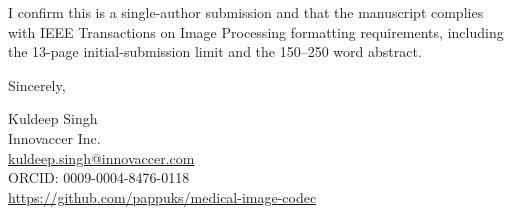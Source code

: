 \documentclass[12pt]{article}
\begin{document}
\bigskip

I confirm this is a single-author submission and that the manuscript complies
with IEEE Transactions on Image Processing formatting requirements, including
the 13-page initial-submission limit and the 150--250 word abstract.

\bigskip

\noindent Sincerely,

\bigskip\bigskip

\noindent Kuldeep Singh\\
Innovaccer Inc.\\
\href{mailto:kuldeep.singh@innovaccer.com}{kuldeep.singh@innovaccer.com}\\
ORCID: 0009-0004-8476-0118\\
\url{https://github.com/pappuks/medical-image-codec}
\end{document}

